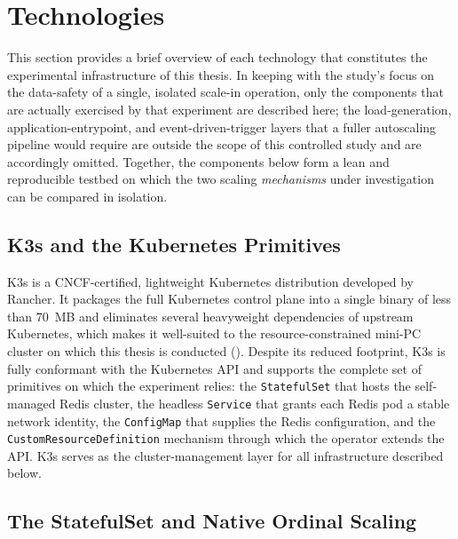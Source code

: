 \newpage

\section{Technologies}
\label{sec:technologies}

This section provides a brief overview of each technology that constitutes the experimental
infrastructure of this thesis. In keeping with the study's focus on the data-safety of a
single, isolated scale-in operation, only the components that are actually exercised by that
experiment are described here; the load-generation, application-entrypoint, and
event-driven-trigger layers that a fuller autoscaling pipeline would require are outside the
scope of this controlled study and are accordingly omitted. Together, the components below
form a lean and reproducible testbed on which the two scaling \textit{mechanisms} under
investigation can be compared in isolation.

\subsection{K3s and the Kubernetes Primitives}
\label{subsec:k3s}

K3s is a CNCF-certified, lightweight Kubernetes distribution developed by Rancher. It
packages the full Kubernetes control plane into a single binary of less than 70~MB and
eliminates several heavyweight dependencies of upstream Kubernetes, which makes it
well-suited to the resource-constrained mini-PC cluster on which this thesis is conducted
(\cite{k3s:docs}). Despite its reduced footprint, K3s is fully conformant with the Kubernetes
API and supports the complete set of primitives on which the experiment relies: the
\texttt{StatefulSet} that hosts the self-managed Redis cluster, the headless \texttt{Service}
that grants each Redis pod a stable network identity, the \texttt{ConfigMap} that supplies the
Redis configuration, and the \texttt{CustomResourceDefinition} mechanism through which the
operator extends the API. K3s serves as the cluster-management layer for all infrastructure
described below.

\subsection{The StatefulSet and Native Ordinal Scaling}
\label{subsec:statefulset}

